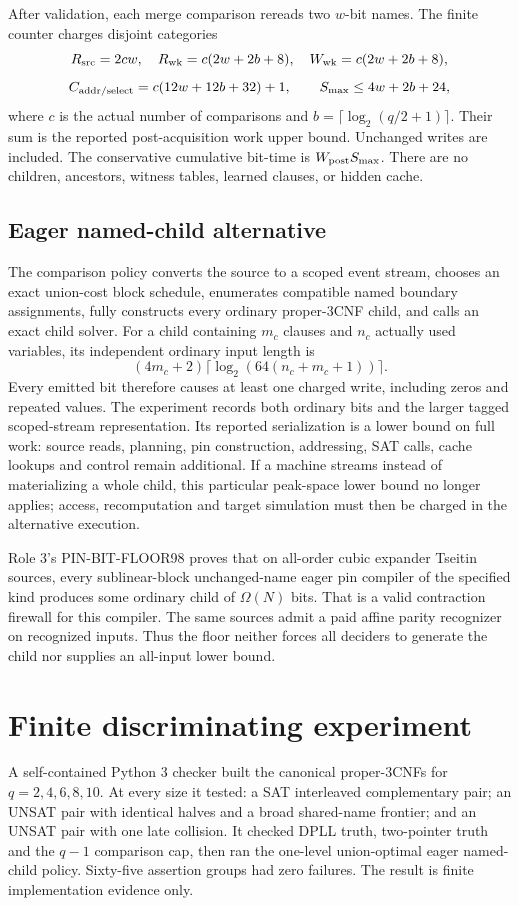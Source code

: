\documentclass[11pt]{article}
\begin{document}
After validation, each merge comparison rereads two $w$-bit names.  The
finite counter charges disjoint categories
\[
 R_{\rm src}=2cw,\quad
 R_{\rm wk}=c(2w+2b+8),\quad
 W_{\rm wk}=c(2w+2b+8),
\]
\[
 C_{\rm addr/select}=c(12w+12b+32)+1,\qquad
 S_{\max}\le4w+2b+24,
\]
where $c$ is the actual number of comparisons and
$b=\lceil\log_2(q/2+1)\rceil$.  Their sum is the reported post-acquisition
work upper bound.  Unchanged writes are included.  The conservative
cumulative bit-time is $W_{\rm post}S_{\max}$.  There are no children,
ancestors, witness tables, learned clauses, or hidden cache.

\subsection*{Eager named-child alternative}
The comparison policy converts the source to a scoped event stream, chooses
an exact union-cost block schedule, enumerates compatible named boundary
assignments, fully constructs every ordinary proper-3CNF child, and calls an
exact child solver.  For a child containing $m_c$ clauses and $n_c$ actually
used variables, its independent ordinary input length is
\[
 (4m_c+2)\lceil\log_2(64(n_c+m_c+1))\rceil.
\]
Every emitted bit therefore causes at least one charged write, including
zeros and repeated values.  The experiment records both ordinary bits and
the larger tagged scoped-stream representation.  Its reported serialization
is a lower bound on full work: source reads, planning, pin construction,
addressing, SAT calls, cache lookups and control remain additional.  If a
machine streams instead of materializing a whole child, this particular
peak-space lower bound no longer applies; access, recomputation and target
simulation must then be charged in the alternative execution.

Role 3's PIN-BIT-FLOOR98 proves that on all-order cubic expander Tseitin
sources, every sublinear-block unchanged-name eager pin compiler of the
specified kind produces some ordinary child of $\Omega(N)$ bits.  That is a
valid contraction firewall for this compiler.  The same sources admit a paid
affine parity recognizer on recognized inputs.  Thus the floor neither forces
all deciders to generate the child nor supplies an all-input lower bound.

\section{Finite discriminating experiment}
A self-contained Python 3 checker built the canonical proper-3CNFs for
$q=2,4,6,8,10$.  At every size it tested: a SAT interleaved complementary
pair; an UNSAT pair with identical halves and a broad shared-name frontier;
and an UNSAT pair with one late collision.  It checked DPLL truth,
two-pointer truth and the $q-1$ comparison cap, then ran the one-level
union-optimal eager named-child policy.  Sixty-five assertion groups had zero
failures.  The result is finite implementation evidence only.
\end{document}
